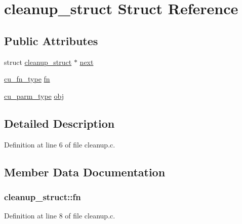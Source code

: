\hypertarget{structcleanup__struct}{}\section{cleanup\+\_\+struct Struct Reference}
\label{structcleanup__struct}
\subsection*{Public Attributes}
\begin{DoxyCompactItemize}
\item 
struct \hyperlink{structcleanup__struct}{cleanup\+\_\+struct} $\ast$ \hyperlink{structcleanup__struct_a809f60f4b467a62b16a474d8179f4b91}{next}
\item 
\hyperlink{cleanup_8h_aeae58fae8a0ea3a6c9accf4c2f48cfb5}{cu\+\_\+fn\+\_\+type} \hyperlink{structcleanup__struct_acd131586969f0cb03430a9c30500d557}{fn}
\item 
\hyperlink{cleanup_8h_a28adc39d27957490f3856456fb779268}{cu\+\_\+parm\+\_\+type} \hyperlink{structcleanup__struct_ad56a9deebffa16a2b41055e42c379436}{obj}
\end{DoxyCompactItemize}


\subsection{Detailed Description}


Definition at line 6 of file cleanup.\+c.



\subsection{Member Data Documentation}
\subsubsection[{\texorpdfstring{fn}{fn}}]{ cleanup\+\_\+struct\+::fn}\hypertarget{structcleanup__struct_acd131586969f0cb03430a9c30500d557}{}\label{structcleanup__struct_acd131586969f0cb03430a9c30500d557}


Definition at line 8 of file cleanup.\+c.

